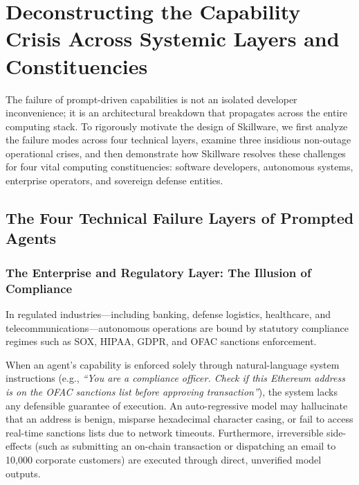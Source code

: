 
\section{Deconstructing the Capability Crisis Across Systemic Layers and Constituencies}
\label{sec:problem_layers}

The failure of prompt-driven capabilities is not an isolated developer inconvenience; it is an architectural breakdown that propagates across the entire computing stack. To rigorously motivate the design of Skillware, we first analyze the failure modes across four technical layers, examine three insidious non-outage operational crises, and then demonstrate how Skillware resolves these challenges for four vital computing constituencies: software developers, autonomous systems, enterprise operators, and sovereign defense entities.

\subsection{The Four Technical Failure Layers of Prompted Agents}
\label{subsec:technical_layers}

\subsubsection{The Enterprise and Regulatory Layer: The Illusion of Compliance}
In regulated industries---including banking, defense logistics, healthcare, and telecommunications---\allowbreak autonomous operations are bound by statutory compliance regimes such as SOX, HIPAA, GDPR, and OFAC sanctions enforcement. 

When an agent's capability is enforced solely through natural-language system instructions (e.g., \emph{``You are a compliance officer. Check if this Ethereum address is on the OFAC sanctions list before approving transaction''}), the system lacks any defensible guarantee of execution. An auto-regressive model may hallucinate that an address is benign, misparse hexadecimal character casing, or fail to access real-time sanctions lists due to network timeouts. Furthermore, irreversible side-effects (such as submitting an on-chain transaction or dispatching an email to 10,000 corporate customers) are executed through direct, unverified model outputs.


